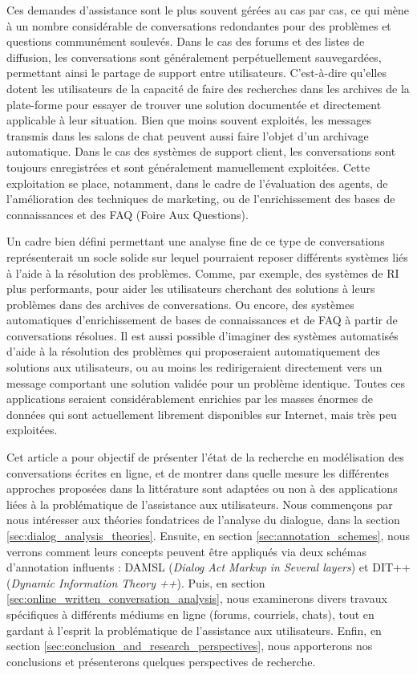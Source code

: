 \documentclass[10pt,a4paper,twoside]{article}
\begin{document}
Ces demandes d'assistance sont le plus souvent gérées au cas par cas, ce qui mène à un nombre considérable de conversations redondantes pour des problèmes et questions communément soulevés. Dans le cas des forums et des listes de diffusion, les conversations sont généralement perpétuellement sauvegardées, permettant ainsi le partage de support entre utilisateurs. C'est-à-dire qu'elles dotent les utilisateurs de la capacité de faire des recherches dans les archives de la plate-forme pour essayer de trouver une solution documentée et directement applicable à leur situation. Bien que moins souvent exploités, les messages transmis dans les salons de chat peuvent aussi faire l'objet d'un archivage automatique. Dans le cas des systèmes de support client, les conversations sont toujours enregistrées et sont généralement manuellement exploitées. Cette exploitation se place, notamment, dans le cadre de l'évaluation des agents, de l'amélioration des techniques de marketing, ou de l'enrichissement des bases de connaissances et des FAQ (Foire Aux Questions).

Un cadre bien défini permettant une analyse fine de ce type de conversations représenterait un socle solide sur lequel pourraient reposer différents systèmes liés à l'aide à la résolution des problèmes. Comme, par exemple, des systèmes de RI plus performants, pour aider les utilisateurs cherchant des solutions à leurs problèmes dans des archives de conversations. Ou encore, des systèmes automatiques d'enrichissement de bases de connaissances et de FAQ à partir de conversations résolues. Il est aussi possible d'imaginer des systèmes automatisés d'aide à la résolution des problèmes qui proposeraient automatiquement des solutions aux utilisateurs, ou au moins les redirigeraient directement vers un message comportant une solution validée pour un problème identique. Toutes ces applications seraient considérablement enrichies par les masses énormes de données qui sont actuellement librement disponibles sur Internet, mais très peu exploitées.

Cet article a pour objectif de présenter l'état de la recherche en modélisation des conversations écrites en ligne, et de montrer dans quelle mesure les différentes approches proposées dans la littérature sont adaptées ou non à des applications liées à la problématique de l'assistance aux utilisateurs. Nous commençons par nous intéresser aux théories fondatrices de l'analyse du dialogue, dans la section \ref{sec:dialog_analysis_theories}. Ensuite, en section \ref{sec:annotation_schemes}, nous verrons comment leurs concepts peuvent être appliqués via deux schémas d'annotation influents : DAMSL (\textit{Dialog Act Markup in Several layers}) et DIT++ (\textit{Dynamic Information Theory ++}). Puis, en section \ref{sec:online_written_conversation_analysis}, nous examinerons divers travaux spécifiques à différents médiums en ligne (forums, courriels, chats), tout en gardant à l'esprit la problématique de l'assistance aux utilisateurs. Enfin, en section \ref{sec:conclusion_and_research_perspectives}, nous apporterons nos conclusions et présenterons quelques perspectives de recherche.
\end{document}
